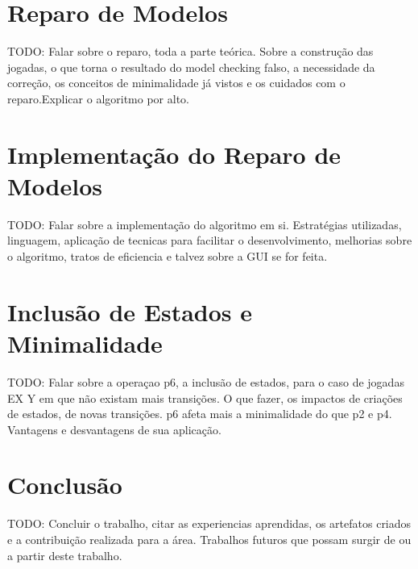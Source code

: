 \documentclass[normaltoc,capchap,capsec,times]{abnt}
\begin{document}
\chapter{Reparo de Modelos}
\label{cap:reparo}

TODO: Falar sobre o reparo, toda a parte teórica. Sobre a construção das jogadas, o que torna o resultado do model checking falso, a necessidade da correção, os conceitos de minimalidade já vistos e os cuidados com o reparo.Explicar o algoritmo por alto.

\chapter{Implementação do Reparo de Modelos}
\label{cap:implementacao}

TODO: Falar sobre a implementação do algoritmo em si. Estratégias utilizadas, linguagem, aplicação de tecnicas para facilitar o desenvolvimento, melhorias sobre o algoritmo, tratos de eficiencia e talvez sobre a GUI se for feita.

\chapter{Inclusão de Estados e Minimalidade}
\label{cap:minimalidade}

TODO: Falar sobre a operaçao p6, a inclusão de estados, para o caso de jogadas EX Y em que não existam mais transições. O que fazer, os impactos de criações de estados, de novas transições. p6 afeta mais a minimalidade do que p2 e p4. Vantagens e desvantagens de sua aplicação. 

\chapter{Conclusão}
\label{cap:conclusao}

TODO: Concluir o trabalho, citar as experiencias aprendidas, os artefatos criados e a contribuição realizada para a área. Trabalhos futuros que possam surgir de ou a partir deste trabalho.



% 
% 
% 





\end{document}
